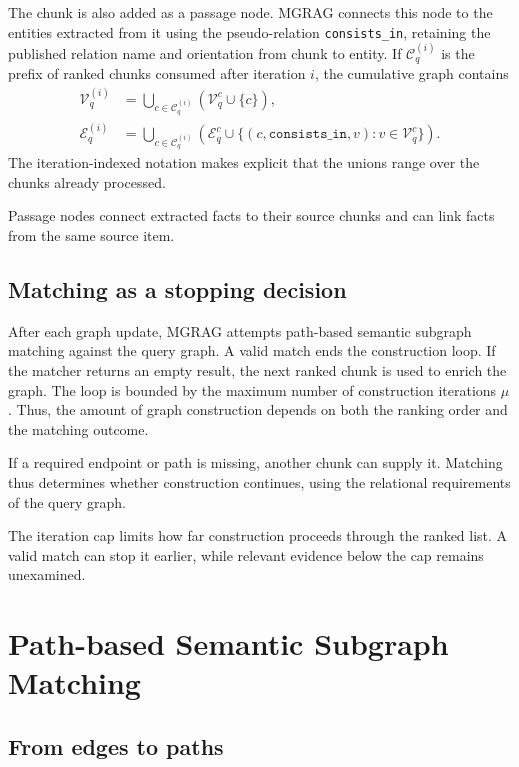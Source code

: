 The chunk is also added as a passage node. MGRAG connects this node to the entities extracted from it using the pseudo-relation \texttt{consists\_in}, retaining the published relation name and orientation from chunk to entity. If $\mathcal C_q^{(i)}$ is the prefix of ranked chunks consumed after iteration $i$, the cumulative graph contains
\begin{align}
 \mathcal V_q^{(i)}
 &=\bigcup_{c\in\mathcal C_q^{(i)}}(\mathcal V_q^c\cup\{c\}),\\
 \mathcal E_q^{(i)}
 &=\bigcup_{c\in\mathcal C_q^{(i)}}\left(\mathcal E_q^c\cup
 \{(c,\texttt{consists\_in},v):v\in\mathcal V_q^c\}\right).
\label{eq:mgrag:graph-union}
\end{align}
The iteration-indexed notation makes explicit that the unions range over the chunks already processed.

Passage nodes connect extracted facts to their source chunks and can link facts from the same source item.

\subsection{Matching as a stopping decision}

After each graph update, MGRAG attempts path-based semantic subgraph matching against the query graph. A valid match ends the construction loop. If the matcher returns an empty result, the next ranked chunk is used to enrich the graph. The loop is bounded by the maximum number of construction iterations $\mu$. Thus, the amount of graph construction depends on both the ranking order and the matching outcome.

If a required endpoint or path is missing, another chunk can supply it. Matching thus determines whether construction continues, using the relational requirements of the query graph.

The iteration cap limits how far construction proceeds through the ranked list. A valid match can stop it earlier, while relevant evidence below the cap remains unexamined.

\section{Path-based Semantic Subgraph Matching}
\label{sec:mgrag:matching}

\subsection{From edges to paths}

